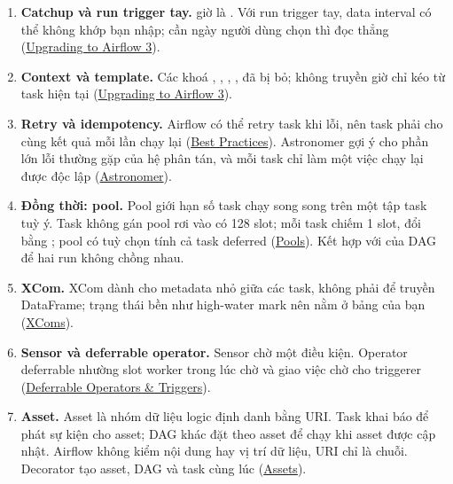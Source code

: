 \begin{enumerate}
  \item \textbf{Catchup và run trigger tay.}  giờ là . Với run trigger tay, data interval có thể không khớp  bạn nhập; cần ngày người dùng chọn thì đọc thẳng  (\href{https://airflow.apache.org/docs/apache-airflow/stable/installation/upgrading_to_airflow3.html}{Upgrading to Airflow 3}).
  \item \textbf{Context và template.} Các khoá , , , ,  đã bị bỏ;  không truyền  giờ chỉ kéo từ task hiện tại (\href{https://airflow.apache.org/docs/apache-airflow/stable/installation/upgrading_to_airflow3.html}{Upgrading to Airflow 3}).
  \item \textbf{Retry và idempotency.} Airflow có thể retry task khi lỗi, nên task phải cho cùng kết quả mỗi lần chạy lại (\href{https://airflow.apache.org/docs/apache-airflow/stable/best-practices.html}{Best Practices}). Astronomer gợi ý  cho phần lớn lỗi thường gặp của hệ phân tán, và mỗi task chỉ làm một việc chạy lại được độc lập (\href{https://www.astronomer.io/docs/airflow/dag-best-practices}{Astronomer}).
  \item \textbf{Đồng thời: pool.} Pool giới hạn số task chạy song song trên một tập task tuỳ ý. Task không gán pool rơi vào  có 128 slot; mỗi task chiếm 1 slot, đổi bằng ; pool có tuỳ chọn tính cả task deferred (\href{https://airflow.apache.org/docs/apache-airflow/stable/administration-and-deployment/pools.html}{Pools}). Kết hợp với  của DAG để hai run không chồng nhau.
  \item \textbf{XCom.} XCom dành cho metadata nhỏ giữa các task, không phải để truyền DataFrame; trạng thái bền như high-water mark nên nằm ở bảng của bạn (\href{https://airflow.apache.org/docs/apache-airflow/stable/core-concepts/xcoms.html}{XComs}).
  \item \textbf{Sensor và deferrable operator.} Sensor chờ một điều kiện. Operator deferrable nhường slot worker trong lúc chờ và giao việc chờ cho triggerer (\href{https://airflow.apache.org/docs/apache-airflow/stable/authoring-and-scheduling/deferring.html}{Deferrable Operators \& Triggers}).
  \item \textbf{Asset.} Asset là nhóm dữ liệu logic định danh bằng URI. Task khai báo  để phát sự kiện cho asset; DAG khác đặt  theo asset để chạy khi asset được cập nhật. Airflow không kiểm nội dung hay vị trí dữ liệu, URI chỉ là chuỗi. Decorator  tạo asset, DAG và task cùng lúc (\href{https://airflow.apache.org/docs/apache-airflow/stable/authoring-and-scheduling/assets.html}{Assets}).

\end{enumerate}
